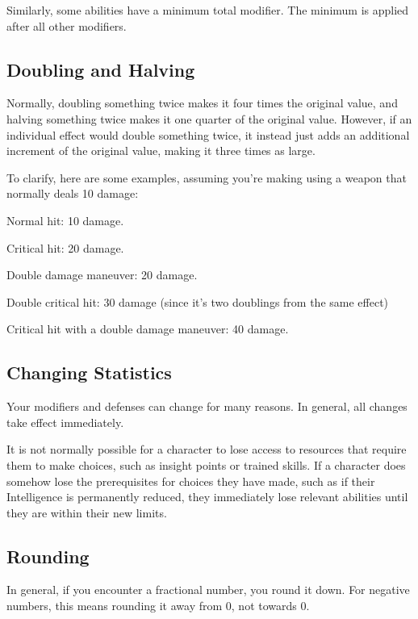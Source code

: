     Similarly, some abilities have a minimum total modifier.
    The minimum is applied after all other modifiers.

  \subsection{Doubling and Halving}\label{Doubling and Halving}
    Normally, doubling something twice makes it four times the original value, and halving something twice makes it one quarter of the original value.
    However, if an individual effect would double something twice, it instead just adds an additional increment of the original value, making it three times as large.

    To clarify, here are some examples, assuming you're making using a weapon that normally deals 10 damage:
    \begin{raggeditemize}
      \item Normal hit: 10 damage.
      \item Critical hit: 20 damage.
      \item Double damage maneuver: 20 damage.
      \item Double critical hit: 30 damage (since it's two doublings from the same effect)
      \item Critical hit with a double damage maneuver: 40 damage.
    \end{raggeditemize}

  \subsection{Changing Statistics}

    Your modifiers and defenses can change for many reasons.
    In general, all changes take effect immediately.

    It is not normally possible for a character to lose access to resources that require them to make choices, such as insight points or trained skills.
    If a character does somehow lose the prerequisites for choices they have made, such as if their Intelligence is permanently reduced, they immediately lose relevant abilities until they are within their new limits.

  \subsection{Rounding}
    In general, if you encounter a fractional number, you round it down.
    For negative numbers, this means rounding it away from 0, not towards 0.

